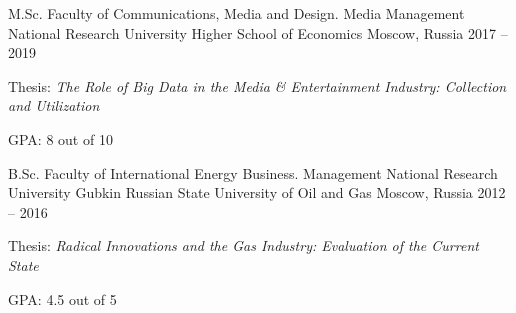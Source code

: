 \documentclass[11pt, a4paper]{awesome-cv}
\begin{document}
\begin{cventries}
\cventry
	{M.Sc. Faculty of Communications, Media and Design. Media Management}
	{National Research University Higher School of Economics}
	{Moscow, Russia}
	{2017 -- 2019}
	{
		\begin{cvitems}
			\item {Thesis: \textit{The Role of Big Data in the Media \& Entertainment Industry: Collection and Utilization}}
			\item {GPA: 8 out of 10}
		\end{cvitems}
	}
	
\cventry
	{B.Sc. Faculty of International Energy Business. Management}
	{National Research University Gubkin Russian State University of Oil and Gas}
	{Moscow, Russia}
	{2012 -- 2016}
	{
		\begin{cvitems}
			\item {Thesis: \textit{Radical Innovations and the Gas Industry: Evaluation of the Current State}}
			\item {GPA: 4.5 out of 5}
		\end{cvitems}
	}
	
\end{cventries}








































\end{document}
